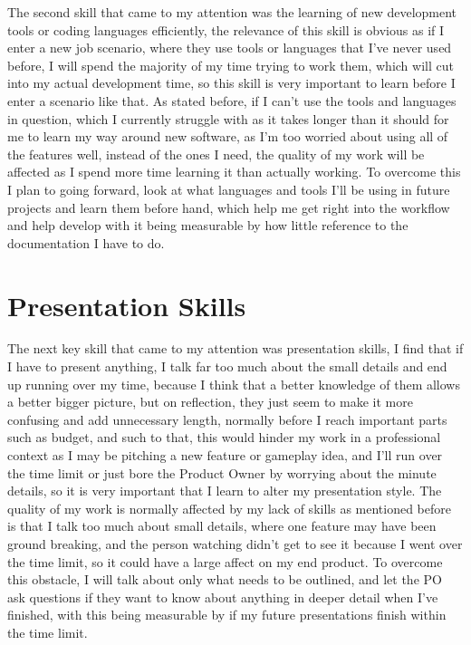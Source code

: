 \documentclass{scrartcl}
\begin{document}
The second skill that came to my attention was the learning of new development tools or coding languages efficiently, the relevance of this skill is obvious as if I enter a new job scenario, where they use tools or languages that I've never used before, I will spend the majority of my time trying to work them, which will cut into my actual development time, so this skill is very important to learn before I enter a scenario like that.  As stated before, if I can't use the tools and languages in question, which I currently struggle with as it takes longer than it should for me to learn my way around new software, as I'm too worried about using all of the features well, instead of the ones I need, the quality of my work will be affected as I spend more time learning it than actually working. To overcome this I plan to going forward, look at what languages and tools I'll be using in future projects and learn them before hand, which help me get right into the workflow and help develop with it being measurable by how little reference to the documentation I have to do. 


\section{Presentation Skills}

The next key skill that came to my attention was presentation skills, I find that if I have to present anything, I talk far too much about the small details and end up running over my time, because I think that a better knowledge of them allows a better bigger picture, but on reflection, they just seem to make it more confusing and add unnecessary length, normally before I reach important parts such as budget, and such to that, this would hinder my work in a professional context as I may be pitching a new feature or gameplay idea, and I'll run over the time limit or just bore the Product Owner by worrying about the minute details, so it is very important that I learn to alter my presentation style. The quality of my work is normally affected by my lack of skills as mentioned before is that I talk too much about small details, where one feature may have been ground breaking, and the person watching didn't get to see it because I went over the time limit, so it could have a large affect on my end product. To overcome this obstacle, I will talk about only what needs to be outlined, and let the PO ask questions if they want to know about anything in deeper detail when I've finished, with this being measurable by if my future presentations finish within the time limit. 
\end{document}
